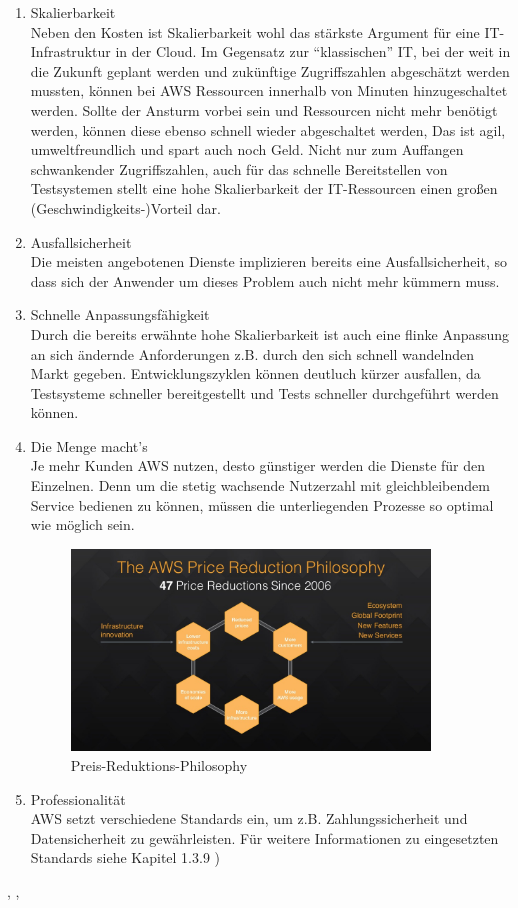 {\begin{enumerate}
  \item Skalierbarkeit
  \\ Neben den Kosten ist Skalierbarkeit wohl das stärkste Argument für eine IT-Infrastruktur in der Cloud. Im Gegensatz zur "`klassischen"' IT, bei der weit in die Zukunft geplant werden und zukünftige Zugriffszahlen abgeschätzt werden mussten, können bei AWS Ressourcen innerhalb von Minuten hinzugeschaltet werden. Sollte der Ansturm vorbei sein und Ressourcen nicht mehr benötigt werden, können diese ebenso schnell wieder abgeschaltet werden, Das ist agil, umweltfreundlich und spart auch noch Geld. Nicht nur zum Auffangen schwankender Zugriffszahlen, auch für das schnelle Bereitstellen von Testsystemen stellt eine hohe Skalierbarkeit der IT-Ressourcen einen großen (Geschwindigkeits-)Vorteil dar.
  \item Ausfallsicherheit
  \\ Die meisten angebotenen Dienste implizieren bereits eine Ausfallsicherheit, so dass sich der Anwender um dieses Problem auch nicht mehr kümmern muss.
  \item Schnelle Anpassungsfähigkeit
  \\ Durch die bereits erwähnte hohe Skalierbarkeit ist auch eine flinke Anpassung an sich ändernde Anforderungen z.B. durch den sich schnell wandelnden Markt gegeben. Entwicklungszyklen können deutluch kürzer ausfallen, da Testsysteme schneller bereitgestellt und Tests schneller durchgeführt werden können.
  \item Die Menge macht's
  \\ Je mehr Kunden AWS nutzen, desto günstiger werden die Dienste für den Einzelnen. Denn um die stetig wachsende Nutzerzahl mit gleichbleibendem Service bedienen zu können, müssen die unterliegenden Prozesse so optimal wie möglich sein.
  \begin{figure}[!ht]
    \centering
    \includegraphics[width=0.9\textwidth]{images/price-reduction.jpg}
    \caption{Preis-Reduktions-Philosophy \cite{aws:insider}}
  \end{figure}
  \item Professionalität
  \\ AWS setzt verschiedene Standards ein, um z.B. Zahlungssicherheit und Datensicherheit zu gewährleisten. Für weitere Informationen zu eingesetzten Standards siehe Kapitel 1.3.9 \cite{wittig:awsinaction})
\end{enumerate} \cite{aws:insider}, \cite{wittig:awsinaction}, \cite{vliet:programmingec2}


}
